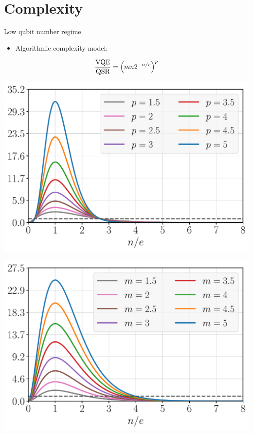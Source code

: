 \documentclass[9pt, handout, aspectratio=169]{beamer}	%
\begin{document}

\section{Complexity}

\begin{frame}{Low qubit number regime}

	\vspace{2em}
	\begin{itemize}
		\item Algorithmic complexity model:
	\end{itemize}
	\vspace{-2em}
	\begin{gather*}
		\frac{\textnormal{VQE}}{\textnormal{QSR}} = \qty(m n 2^{-n/r})^{p}
	\end{gather*}

	\vspace{-1em}
	\begin{multicols}{2}

		\begin{center}
			\includegraphics[width=.40\paperwidth]{Figures/VQE-vs-QSR_p}
		\end{center}

		\columnbreak

		\begin{center}
			\includegraphics[width=.40\paperwidth]{Figures/VQE-vs-QSR_m}
		\end{center}


\end{multicols}
\end{frame}
\end{document}
